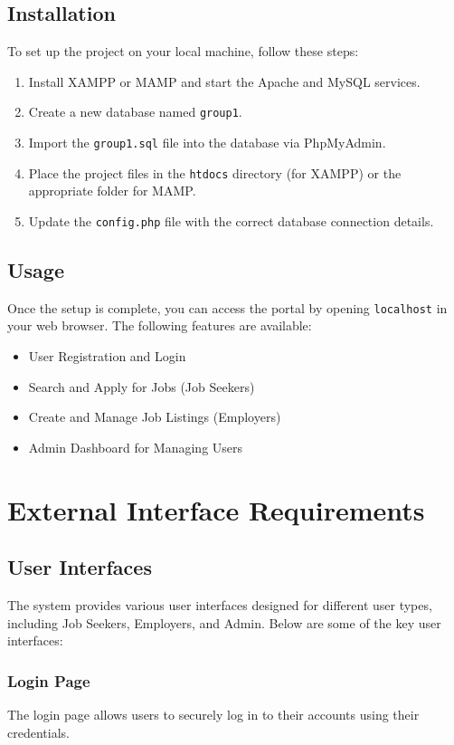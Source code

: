 \documentclass[a4paper,12pt]{article}
\begin{document}
\subsection{Installation}
To set up the project on your local machine, follow these steps:

\begin{enumerate}
    \item Install XAMPP or MAMP and start the Apache and MySQL services.
    \item Create a new database named \texttt{group1}.
    \item Import the \texttt{group1.sql} file into the database via PhpMyAdmin.
    \item Place the project files in the \texttt{htdocs} directory (for XAMPP) or the appropriate folder for MAMP.
    \item Update the \texttt{config.php} file with the correct database connection details.
\end{enumerate}

\subsection{Usage}
Once the setup is complete, you can access the portal by opening \texttt{localhost} in your web browser. The following features are available:
\begin{itemize}
    \item User Registration and Login
    \item Search and Apply for Jobs (Job Seekers)
    \item Create and Manage Job Listings (Employers)
    \item Admin Dashboard for Managing Users
\end{itemize}

\newpage

\section{External Interface Requirements}

\subsection{User Interfaces}
The system provides various user interfaces designed for different user types, including Job Seekers, Employers, and Admin. Below are some of the key user interfaces:

\subsubsection{Login Page}
The login page allows users to securely log in to their accounts using their credentials.
\end{document}
